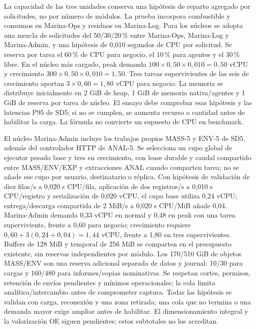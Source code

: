 La capacidad de las tres unidades conserva una hipótesis de reparto agregado por solicitudes, no por número de módulos. La prueba incorpora combustible y consumos en Marina-Ops y residuos en Marina-Log. Para los núcleos se adopta una mezcla de solicitudes del 50/30/20\,\% entre Marina-Ops, Marina-Log y Marina-Admin, y una hipótesis de 0,010 segundos de CPU por solicitud. Se reserva por tarea el 60\,\% de CPU para negocio, el 10\,\% para agentes y el 30\,\% libre. En el núcleo más cargado, peak demanda $100\times0,50\times0,010=0,50$ vCPU y crecimiento $300\times0,50\times0,010=1,50$. Tres tareas supervivientes de las seis de crecimiento aportan $3\times0,60=1,80$ vCPU para negocio. La memoria se distribuye inicialmente en 2 GiB de heap, 1 GiB de memoria nativa/agentes y 1 GiB de reserva por tarea de núcleo. El ensayo debe comprobar esas hipótesis y las latencias P95 de SD5; si no se cumplen, se aumenta recurso o cantidad antes de habilitar la carga. La fórmula no convierte un supuesto de CPU en benchmark.

El núcleo Marina-Admin incluye los trabajos propios MASS-5 y ENV-5 de SD5, además del controlador HTTP de ANAL-5. Se selecciona un cupo global de ejecutor pesado base y tres en crecimiento, con lease durable y caudal compartido entre MASS/ENV/EXP y extracciones ANAL cuando comparten tarea; no se añade ese cupo por usuario, destinatario o réplica. Con hipótesis de validación de diez filas/s a 0,020 s CPU/fila, aplicación de dos registros/s a 0,010 s CPU/registro y serialización de 0,020 vCPU, el cupo base utiliza 0,24 vCPU; entrega/descarga compartida de 2 MiB/s a 0,020 s CPU/MiB añade 0,04. Marina-Admin demanda 0,33 vCPU en normal y 0,48 en peak con una tarea superviviente, frente a 0,60 para negocio; crecimiento requiere $0,60+3(0,24+0,04)=1,44$ vCPU, frente a 1,80 en tres supervivientes. Buffers de 128 MiB y temporal de 256 MiB se comparten en el presupuesto existente, sin reservas independientes por módulo. Los 170/510 GiB de objetos MASS/ENV son una reserva adicional separada de datos y journal: 10/30 para cargas y 160/480 para informes/copias nominativas. Se respetan cortes, permisos, retención de envíos pendientes y mínimos operacionales; la cola limita analítica/intercambio antes de comprometer captura. Todas las hipótesis se validan con carga, reconexión y una zona retirada; una cola que no termina o una demanda mayor exige ampliar antes de habilitar. El dimensionamiento integral y la valorización OE siguen pendientes; estos subtotales no los acreditan.

